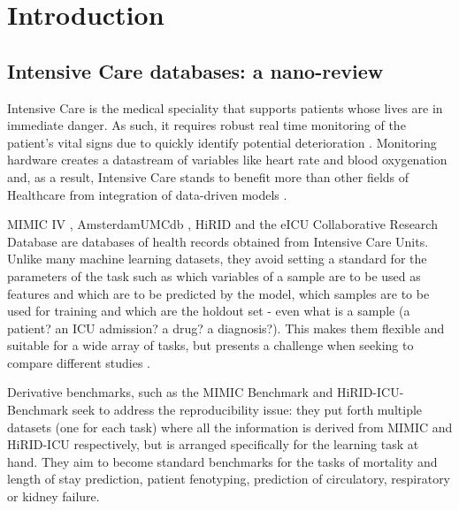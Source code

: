 
\section{Introduction}



\subsection{Intensive Care databases: a nano-review}
\label{sec:datasets}

Intensive Care is the medical speciality that supports patients whose lives are in immediate danger.
As such, it requires robust real time monitoring of the patient's vital signs due to quickly identify potential deterioration \cite{Bailey2013trial, Blount2010Real, Bockholt2022Real, Dimitrios1999Distributed, Fried2000Some, Mao2012integrated, Prgomet2016Vital, Vincent2018Improving}.
Monitoring hardware creates a datastream of variables like heart rate and blood oxygenation and, as a result, Intensive Care stands to benefit more than other fields of Healthcare from integration of data-driven models \cite{nunezreizBigDataAnalysis2019}.

MIMIC IV \cite{johnsonMIMICIVFreelyAccessible2023}, AmsterdamUMCdb \cite{amsterdamumcdb-a}, HiRID \cite{yecheHiRIDICUBenchmarkComprehensiveMachine} and the eICU Collaborative Research Database \cite{pollard2018a} are databases of health records obtained from Intensive Care Units.
Unlike many machine learning datasets, they avoid setting a standard for the parameters of the task such as which variables of a sample are to be used as features and which are to be predicted by the model, which samples are to be used for training and which are the holdout set - even what is a sample (a patient? an ICU admission? a drug? a diagnosis?). This makes them flexible and suitable for a wide array of tasks, but presents a challenge when seeking to compare different studies \cite{mcdermottReproducibilityMachineLearning2021}.

Derivative benchmarks, such as the MIMIC Benchmark \cite{harutyunyanMultitaskLearningBenchmarking2019} and HiRID-ICU-Benchmark \cite{yecheHiRIDICUBenchmarkComprehensiveMachine} seek to address the reproducibility issue: they put forth multiple datasets (one for each task) where all the information is derived from MIMIC and HiRID-ICU respectively, but is arranged specifically for the learning task at hand. They aim to become standard benchmarks for the tasks of mortality and length of stay prediction, patient fenotyping, prediction of circulatory, respiratory or kidney failure.

